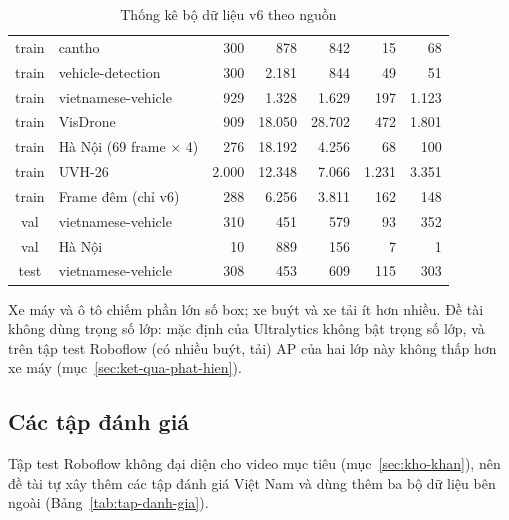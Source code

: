 \begin{table}[H]
  \centering
  \caption{Thống kê bộ dữ liệu v6 theo nguồn}
  \label{tab:thong-ke}
  \small
  \begin{tabularx}{\linewidth}{cLrrrrr}
    \toprule
     &  &  &  &  &  &  \\ \midrule
    train & cantho & 300 & 878 & 842 & 15 & 68 \\
    train & vehicle-detection & 300 & 2.181 & 844 & 49 & 51 \\
    train & vietnamese-vehicle & 929 & 1.328 & 1.629 & 197 & 1.123 \\
    train & VisDrone & 909 & 18.050 & 28.702 & 472 & 1.801 \\
    train & Hà Nội (69 frame × 4) & 276 & 18.192 & 4.256 & 68 & 100 \\
    train & UVH-26 & 2.000 & 12.348 & 7.066 & 1.231 & 3.351 \\
    train & Frame đêm (chỉ v6) & 288 & 6.256 & 3.811 & 162 & 148 \\
    val & vietnamese-vehicle & 310 & 451 & 579 & 93 & 352 \\
    val & Hà Nội & 10 & 889 & 156 & 7 & 1 \\
    test & vietnamese-vehicle & 308 & 453 & 609 & 115 & 303 \\ \bottomrule
  \end{tabularx}
\end{table}

Xe máy và ô tô chiếm phần lớn số box; xe buýt và xe tải ít hơn nhiều. Đề tài không dùng trọng số lớp: mặc định của
Ultralytics không bật trọng số lớp, và trên tập test Roboflow (có nhiều buýt, tải) AP của hai lớp này không thấp hơn
xe máy (mục~\ref{sec:ket-qua-phat-hien}).

\subsection{Các tập đánh giá}
\label{sec:tap-danh-gia}

Tập test Roboflow không đại diện cho video mục tiêu (mục~\ref{sec:kho-khan}), nên đề tài tự xây thêm các tập đánh giá
Việt Nam và dùng thêm ba bộ dữ liệu bên ngoài (Bảng~\ref{tab:tap-danh-gia}).

